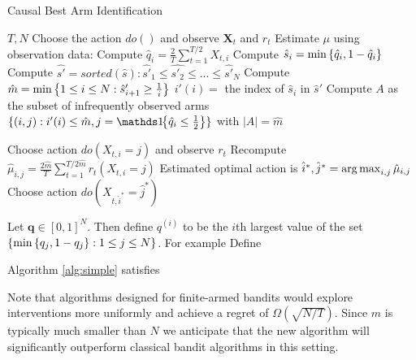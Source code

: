 \begin{algorithm}[h]
\caption{Causal Best Arm Identification}\label{alg:simple}
\begin{algorithmic}[1]
 $T, N$
\STATE Choose the action $do()$ and observe $\boldsymbol{X}_t$ and $r_t$
\ENDFOR
\STATE Estimate $\mu$ using observation data:
\STATE Compute $\hat q_i = \frac{2}{T} \sum_{t=1}^{T/2} X_{t,i}$
\STATE Compute $\hat s_i = \min\left\{\hat q_i, 1 - \hat q_i\right\}$
\STATE Compute $\hat{s'} = sorted(\hat{s}) : \hat{s'}_1 \leq \hat{s'_2} \leq ... \leq \hat{s'}_N$
\STATE Compute $\hat m = \min\left\{1 \leq i \leq N : \hat s'_{i+1} \geq \frac{1}{i}\right\}$
\STATE $i'(i) = $ the index of $\hat s_i$ in $\hat s'$
\STATE Compute $A$ as the subset of infrequently observed arms $\{(i,j):i'(i) \leq \hat m, j = \ind{\hat q_{i} \leq \frac{1}{2}} \}$ with $|A| = \hat m$

\STATE Choose action $do(X_{t,i} = j)$ and observe $r_t$
\ENDFOR
\STATE Recompute $\hat \mu_{i,j} = \frac{2\hat m}{T} \sum_{t=1}^{ T/2\hat m} r_t(X_{t,i}=j)$ 
\ENDFOR
\STATE Estimated optimal action is $\hat i^*, \hat j^* = \argmax_{i,j} \hat \mu_{i,j}$
\STATE Choose action $do(X_{t,\hat i^*} = \hat j^*)$
\end{algorithmic}
\end{algorithm}


\begin{definition}
Let $\boldsymbol{q} \in [0,1]^N$. Then define $q^{(i)}$ to be the $i$th largest value of the set $\left\{\min \left\{q_j, 1 - q_j\right\} : 1 \leq j \leq N\right\}$.
For example
Define 
\end{definition}

\begin{theorem}\label{thm:uq-simple}
Algorithm \ref{alg:simple} satisfies
\end{theorem}

Note that algorithms designed for finite-armed bandits would explore interventions more uniformly and achieve a regret of $\Omega(\sqrt{N/T})$.
Since $m$ is typically much smaller than $N$ we anticipate that the new algorithm will significantly outperform classical bandit algorithms in
this setting.

